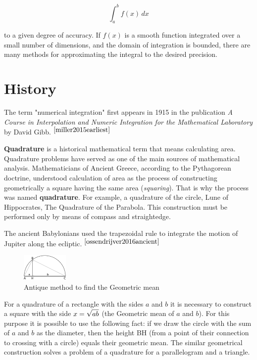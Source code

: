 \documentclass[a4paper]{article}
\begin{document}
\begin{equation*}
	\int _{a}^{b}f(x)\,dx
\end{equation*}

to a given degree of accuracy. If $f(x)$ is a smooth function integrated over a small number of dimensions, and the domain of integration is bounded, there are many methods for approximating the integral to the desired precision.

\tableofcontents

\section{History}
The term "numerical integration" first appears in 1915 in the publication \textit{A Course in Interpolation and Numeric Integration for the Mathematical Laboratory} by David Gibb.$^{~\cite{miller2015earliest}}$

\textbf{Quadrature} is a historical mathematical term that means calculating area. Quadrature problems have served as one of the main sources of mathematical analysis. Mathematicians of Ancient Greece, according to the Pythagorean doctrine, understood calculation of area as the process of constructing geometrically a square having the same area (\textit{squaring}). That is why the process was named \textbf{quadrature}. For example, a quadrature of the circle, Lune of Hippocrates, The Quadrature of the Parabola. This construction must be performed only by means of compass and straightedge.

The ancient Babylonians used the trapezoidal rule to integrate the motion of Jupiter along the ecliptic.$^{~\cite{ossendrijver2016ancient}}$

\begin{figure}
	\begin{center}
		\includegraphics[width=0.2\textwidth]{2}
	\end{center}
	\caption{Antique method to find the Geometric mean}
\end{figure}
For a quadrature of a rectangle with the sides $a$ and $b$ it is necessary to construct a square with the side ${\displaystyle x={\sqrt {ab}}}$ (the Geometric mean of $a$ and $b$). For this purpose it is possible to use the following fact: if we draw the circle with the sum of $a$ and $b$ as the diameter, then the height BH (from a point of their connection to crossing with a circle) equals their geometric mean. The similar geometrical construction solves a problem of a quadrature for a parallelogram and a triangle.
\end{document}
